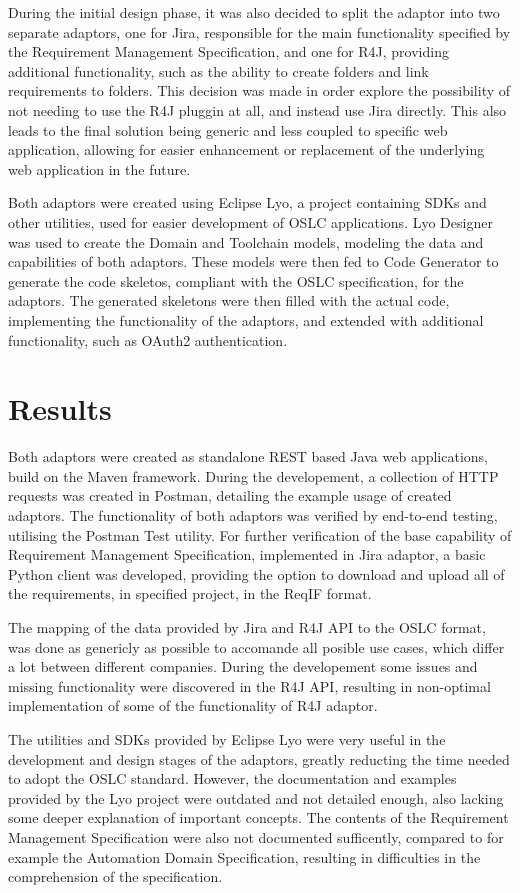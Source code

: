 During the initial design phase, it was also decided to split the adaptor into two separate adaptors, one for Jira, responsible for the main functionality specified by the Requirement Management Specification, and one for R4J, providing additional functionality, such as the ability to create folders and link requirements to folders. This decision was made in order explore the possibility of not needing to use the R4J pluggin at all, and instead use Jira directly. This also leads to the final solution being generic and less coupled to specific web application, allowing for easier enhancement or replacement of the underlying web application in the future.

Both adaptors were created using Eclipse Lyo, a project containing SDKs and other utilities, used for easier development of OSLC applications. Lyo Designer was used to create the Domain and Toolchain models, modeling the data and capabilities of both adaptors. These models were then fed to Code Generator to generate the code skeletos, compliant with the OSLC specification, for the adaptors. The generated skeletons were then filled with the actual code, implementing the functionality of the adaptors, and extended with additional functionality, such as OAuth2 authentication.

\section{Results}
Both adaptors were created as standalone REST based Java web applications, build on the Maven framework. During the developement, a collection of HTTP requests was created in Postman, detailing the example usage of created adaptors. The functionality of both adaptors was verified by end-to-end testing, utilising the Postman Test utility. For further verification of the base capability of Requirement Management Specification, implemented in Jira adaptor, a basic Python client was developed, providing the option to download and upload all of the requirements, in specified project, in the ReqIF format. 

The mapping of the data provided by Jira and R4J API to the OSLC format, was done as genericly as possible to accomande all posible use cases, which differ a lot between different companies. During the developement some issues and missing functionality were discovered in the R4J API, resulting in non-optimal implementation of some of the functionality of R4J adaptor.

The utilities and SDKs provided by Eclipse Lyo were very useful in the development and design stages of the adaptors, greatly reducting the time needed to adopt the OSLC standard. However, the documentation and examples provided by the Lyo project were outdated and not detailed enough, also lacking some deeper explanation of important concepts. The contents of the Requirement Management Specification were also not documented sufficently, compared to for example the Automation Domain Specification, resulting in difficulties in the comprehension of the specification.

